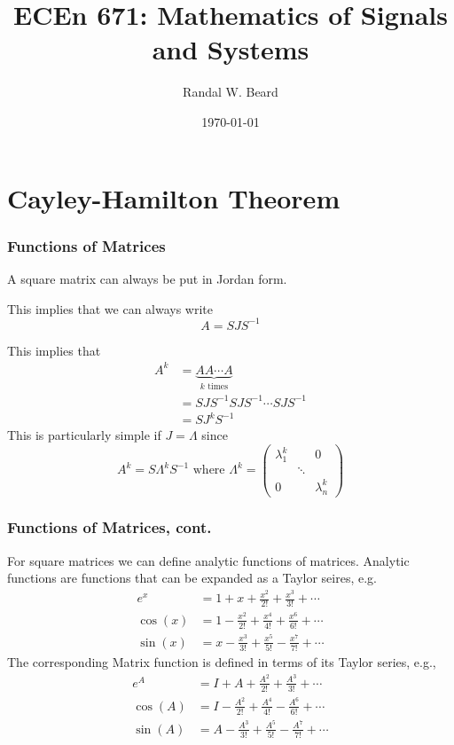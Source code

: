 \documentclass{beamer}
\title{ECEn 671: Mathematics of Signals and Systems}
\author{Randal W. Beard}
\institute{Brigham Young University}
\date{\today}
\begin{document}
\begin{frame}
	\titlepage
\end{frame}

\section{Cayley-Hamilton Theorem}
\frame{\sectionpage}


\begin{frame}\frametitle{Functions of Matrices}
	\begin{lemma}
	A square matrix can always be put in Jordan form.	
	\end{lemma}
	This implies that we can always write
	\[ 
		A = SJS^{-1} 
	\]
	
	This implies that 
	\begin{align*}
		A^k &= \underbrace{AA\cdots A}_{k\text{ times}} \\
		    &= SJS^{-1}SJS^{-1}\cdots SJS^{-1} \\
		    &= SJ^kS^{-1} 
	\end{align*}
	This is particularly simple if $J = \Lambda$ since 
	\[ 
		A^k = S\Lambda^kS^{-1} 
		\text{ where } 
		\Lambda^k 
			= \begin{pmatrix}
	    		\lambda_1^k & & 0\\
	    		& \ddots \\
	    		0 & & \lambda_n^k
	  		  \end{pmatrix} 
	\]	
\end{frame}

\begin{frame}\frametitle{Functions of Matrices, cont.}
	For square matrices we can define analytic functions of matrices.
	Analytic functions are functions that can be expanded as a Taylor
	seires, e.g.
	\begin{align*}
		e^x &= 1 + x + \frac{x^2}{2!} + \frac{x^3}{3!} + \cdots \\
		\cos(x) &= 1 - \frac{x^2}{2!} + \frac{x^4}{4!} + \frac{x^6}{6!} + \cdots \\
		\sin(x) &= x - \frac{x^3}{3!} + \frac{x^5}{5!} - \frac{x^7}{7!} + \cdots 
	\end{align*}
	The corresponding Matrix function is defined in terms of its Taylor
	series, e.g.,
	\begin{align*}
		e^A &= I + A + \frac{A^2}{2!} + \frac{A^3}{3!} + \cdots\\
		\cos(A) &= I - \frac{A^2}{2!} + \frac{A^4}{4!} - \frac{A^6}{6!} + \cdots\\
		\sin(A) &= A - \frac{A^3}{3!} + \frac{A^5}{5!} - \frac{A^7}{7!} + \cdots
	\end{align*}

\end{frame}
\end{document}
